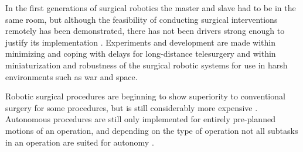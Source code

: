 In the first generations of surgical robotics the master and slave had to be in the same room, %
but although the feasibility of conducting surgical interventions remotely has been demonstrated, there has not been drivers strong enough to justify its implementation \citep[p 38]{bib:surgical_book}. Experiments and development are made within minimizing and coping with delays for long-distance telesurgery and within miniaturization and robustness of the surgical robotic systems for use in harsh environments such as war and space. %

Robotic surgical procedures are beginning to show superiority to conventional surgery for some procedures, but is still considerably more expensive \citep{bib:docatadist}. 
Autonomous procedures are still only implemented for entirely pre-planned motions of an operation, and depending on the type of operation not all subtasks in an operation are suited for autonomy \citep{bib:raven_debride,bib:raven_ii}.




 





